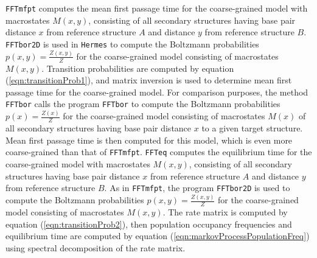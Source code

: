 {\tt FFTmfpt} computes the mean first passage time
for the coarse-grained model with macrostates $M(x,y)$, consisting of
all secondary structures having base pair distance $x$ from reference
structure $A$ and distance $y$ from reference structure $B$.
{\tt FFTbor2D} is used in {\tt Hermes} to compute the Boltzmann probabilities
$p(x,y) = \frac{Z(x,y)}{Z}$ for the coarse-grained model consisting of
macrostates $M(x,y)$. Transition probabilities are computed by
equation (\ref{eqn:transitionProb1}), and matrix inversion is used to
determine mean first passage time for the coarse-grained model.
For comparison purposes, the method {\tt FFTbor} calls the
program {\tt FFTbor} \cite{Senter.po12} to compute the Boltzmann probabilities
$p(x) = \frac{Z(x)}{Z}$ for the coarse-grained model consisting of
macrostates $M(x)$ of all secondary structures having base pair distance
$x$ to a given target structure. Mean first passage time is then computed
for this model, which is even more coarse-grained than that of {\tt FFTmfpt}.
{\tt FFTeq} computes the equilibrium time
for the coarse-grained model with macrostates $M(x,y)$, consisting of
all secondary structures having base pair distance $x$ from reference
structure $A$ and distance $y$ from reference structure $B$. As in
{\tt FFTmfpt}, the program
{\tt FFTbor2D} is used to compute the Boltzmann probabilities
$p(x,y) = \frac{Z(x,y)}{Z}$ for the coarse-grained model consisting of
macrostates $M(x,y)$. The rate matrix is computed by
equation (\ref{eqn:transitionProb2}), then population occupancy
frequencies and equilibrium time
are computed by equation (\ref{eqn:markovProcessPopulationFreq})
using spectral decomposition of the rate matrix.


